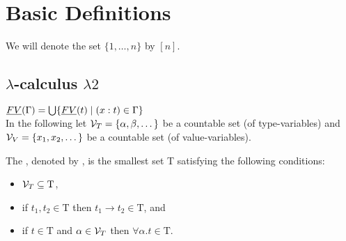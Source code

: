 \section{Basic Definitions}
We will denote the set $\{1,\dots,n\}$ by $\left[n\right]$.
\subsection{$\lambda$-calculus $\lambda2$}
$\emph{FV}(\Gamma)=\bigcup\{\emph{FV}(t)\mid (x:t)\in \Gamma\}$\\
In the following let $\mathcal{V}_T=\{\alpha,\beta,\dots\}$ be a countable set (of type-variables) and $\mathcal{V}_V=\{x_1,x_2,\dots\}$ be a countable set (of value-variables).
\begin{definition}
The , denoted by \lambdaTypes{}, is the smallest set T satisfying the following conditions:
\begin{itemize}
\item $\mathcal{V}_T\subseteq\text{T}$,
\item if $t_1,t_2\in\text{T}$ then $t_1\to t_2\in\text{T}$, and
\item if $t\in\text{T}$ and $\alpha\in\mathcal{V}_T$ then $\forall\alpha.t\in\text{T}$.
\end{itemize}
\end{definition}


